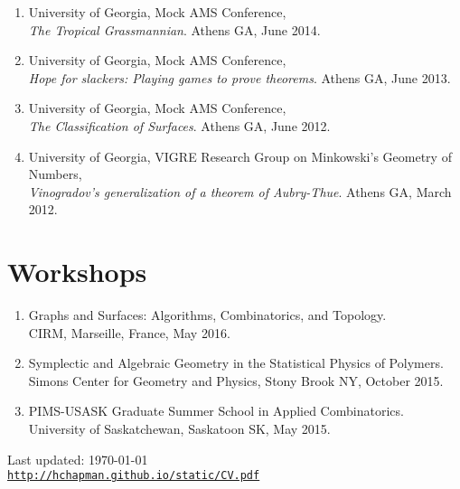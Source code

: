 \documentclass[letterpaper]{article}
\def\footerlink{http://hchapman.github.io/static/CV.pdf}
\begin{document}
\begin{enumerate}
\item University of Georgia, Mock AMS Conference, \\
  \textit{The Tropical Grassmannian}. Athens GA, June 2014.
  
\item University of Georgia, Mock AMS Conference, \\
  \textit{Hope for slackers: Playing games to prove theorems}. Athens GA, June 2013.
  
\item University of Georgia, Mock AMS Conference, \\
  \textit{The Classification of Surfaces}. Athens GA, June 2012.
  
\item University of Georgia, VIGRE Research Group on Minkowski's Geometry of Numbers, \\
  \textit{Vinogradov's generalization of a theorem of Aubry-Thue}. Athens GA, March 2012.

\end{enumerate}


\section*{Workshops}
\begin{enumerate}
\item Graphs and Surfaces: Algorithms, Combinatorics, and Topology. \\
  CIRM, Marseille, France, May 2016.
\item Symplectic and Algebraic Geometry in the Statistical Physics of Polymers. \\
  Simons Center for Geometry and Physics, Stony Brook NY, October 2015. 
\item PIMS-USASK Graduate Summer School in Applied Combinatorics. \\
  University of Saskatchewan, Saskatoon SK, May 2015.
\end{enumerate}

\bigskip

\begin{center}
  \begin{footnotesize}
    Last updated: \today \\
    \href{\footerlink}{\texttt{\footerlink}}
  \end{footnotesize}
\end{center}
\end{document}
